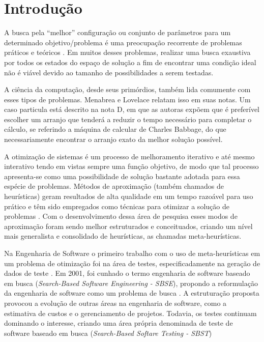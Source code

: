 \chapter[Introdução]{Introdução}

A busca pela ``melhor'' configuração ou conjunto de parâmetros para um determinado objetivo/problema é uma preocupação recorrente de problemas práticos e teóricos \cite{combinatorialoptimization1998}. Em muitos desses problemas, realizar uma busca exaustiva por todos os estados do espaço de solução a fim de encontrar uma condição ideal não é viável devido ao tamanho de possibilidades a serem testadas. 

A ciência da computação, desde seus primórdios, também lida comumente com esses tipos de problemas. Menabrea e Lovelace relatam isso em suas notas\cite{menabrea1842sketch}. Um caso particula está descrito na nota D, em que as autoras expõem que é preferível escolher um arranjo que tenderá a reduzir o tempo necessário para completar o cálculo, se referindo a
máquina de calcular de Charles Babbage, do que necessariamente encontrar o arranjo exato da melhor solução possível\cite{menabrea1842sketch}.

A otimização de sistemas é um processo de melhoramento iterativo e até mesmo interativo tendo em vistas sempre uma função objetivo, de modo que tal processo apresenta-se como uma possibilidade de solução bastante adotada para essa espécie de problemas. Métodos de aproximação (também chamados de heurísticas) geram resultados de alta qualidade em um tempo razoável para uso prático e têm sido empregados como técnicas para otimizar a solução de problemas \cite{gendreau2005metaheuristics}. Com o desenvolvimento dessa área de pesquisa esses modos de aproximação foram sendo melhor estruturados e conceituados, criando um nível mais generalista e consolidado de heurísticas, as chamadas meta-heurísticas.

Na Engenharia de Software o primeiro trabalho com o uso de meta-heurísticas em um problema de otimização foi na área de testes, especificadamente na geração de dados de teste \cite{miller1976automatic}. Em 2001, foi cunhado o termo engenharia de software baseado em busca (\textit{Search-Based Software Engineering - SBSE}), propondo a reformulação da engenharia de software como um problema de busca \cite{harman2001search}. A estruturação proposta provocou a evolução de outras áreas na engenharia de software, como a estimativa de custos e o gerenciamento de projetos. Todavia, os testes continuam dominando o interesse, criando uma área própria denominada de teste de software baseado em busca (\textit{Search-Based Softare Testing - SBST}) \cite{harman2012search}

